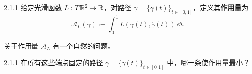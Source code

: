 \begin{wdefn}{2.1.1}
给定光滑函数 $L:T\mathbb{R}^2\to\mathbb{R}$，对路径 $\gamma=\{\gamma(t)\}_{t\in[0,1]}$，定义其\textbf{作用量}为
\begin{equation*}
  \mathcal{A}_L(\gamma):=\int_0^1L(\gamma(t),\dot\gamma(t))\,\dd t .
\end{equation*}
\end{wdefn}

关于作用量 $\mathcal{A}_L$ 有一个自然的问题。

\begin{wque}{2.1.1}
在所有这些端点固定的路径 $\gamma=\{\gamma(t)\}_{t\in[0,1]}$ 中，哪一条使作用量最小？
\end{wque}

